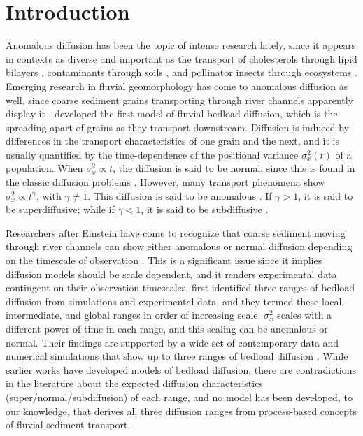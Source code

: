 \documentclass[]{agujournal2018}
\begin{document}
\section{Introduction}
Anomalous diffusion has been the topic of intense research lately, since it appears in contexts as diverse and important as the transport of cholesterols through lipid bilayers \citep{Jeon2012,Molina-Garcia2018}, contaminants through soils \citep{Berkowitz2006,Yang2019}, and pollinator insects through ecosystems \citep{Reynolds2009,Vallaeys2017}.
Emerging research in fluvial geomorphology has come to anomalous diffusion as well, since coarse sediment grains transporting through river channels apparently display it \citep{Martin2012,Bradley2017}.
\citet{Einstein1937} developed the first model of fluvial bedload diffusion, which is the spreading apart of grains as they transport downstream.
Diffusion is induced by differences in the transport characteristics of one grain and the next, and it is usually quantified by the time-dependence of the positional variance $\sigma_x^2(t)$ of a population.
When $\sigma_x^2 \propto t$, the diffusion is said to be normal, since this is found in the classic diffusion problems \citep[e.g.][]{Einstein1905,Taylor1920}.
However, many transport phenomena show $\sigma_x^2 \propto t^\gamma$, with $\gamma \neq 1$. This diffusion is said to be anomalous \citep{Sokolov2012}.
If $\gamma>1$, it is said to be superdiffusive; while if $\gamma <1$, it is said to be subdiffusive \citep{Metzler2000}.

Researchers after Einstein have come to recognize that coarse sediment moving through river channels can show either anomalous or normal diffusion depending on the timescale of observation \citep{Nikora2002}.
This is a significant issue since it implies diffusion models should be scale dependent, and it renders experimental data contingent on their observation timescales.
\citet{Nikora2001a,Nikora2002} first identified three ranges of bedload diffusion from simulations and experimental data, and they termed these local, intermediate, and global ranges in order of increasing scale.
$\sigma_x^2$ scales with a different power of time in each range, and this scaling can be anomalous or normal.
Their findings are supported by a wide set of contemporary data and numerical simulations that show up to three ranges of bedload diffusion \citep{Martin2012, Bialik2012, Zhang2012, Fan2016, Bradley2017,Wu2019}.
While earlier works have developed models of bedload diffusion, there are contradictions in the literature about the expected diffusion characteristics (super/normal/subdiffusion) of each range, and no model has been developed, to our knowledge, that derives all three diffusion ranges from process-based concepts of fluvial sediment transport.
\end{document}
